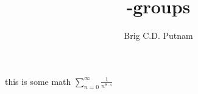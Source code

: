 \documentclass{article}
\title{\alpha-groups}
\author{Brig C.D. Putnam}
\begin{document}
\maketitle

this is some math $\sum_{n=0}^{\infty}\frac{1}{n^{\theta \cdot \pi}}$
\end{document}
